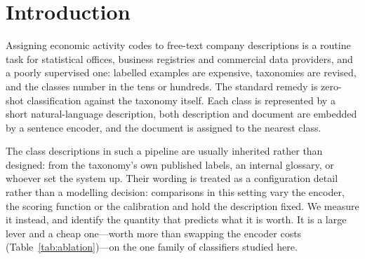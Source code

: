 \documentclass[11pt]{article}
\begin{document}
\section{Introduction}

Assigning economic activity codes to free-text company descriptions is a
routine task for statistical offices, business registries and commercial data
providers, and a poorly supervised one: labelled examples are expensive,
taxonomies are revised, and the classes number in the tens or hundreds. The
standard remedy is zero-shot classification against the taxonomy itself. Each
class is represented by a short natural-language description, both description
and document are embedded by a sentence encoder, and the document is assigned to
the nearest class.

The class descriptions in such a pipeline are usually inherited rather than
designed: from the taxonomy's own published labels, an internal glossary, or
whoever set the system up. Their wording is treated as a configuration detail
rather than a modelling decision: comparisons in this setting vary the encoder,
the scoring function or the calibration and hold the description fixed. We
measure it instead, and identify the quantity that predicts what it is worth. It
is a large lever and a cheap one---worth more than swapping the encoder costs
(Table~\ref{tab:ablation})---on the one family of classifiers studied here.
\end{document}
